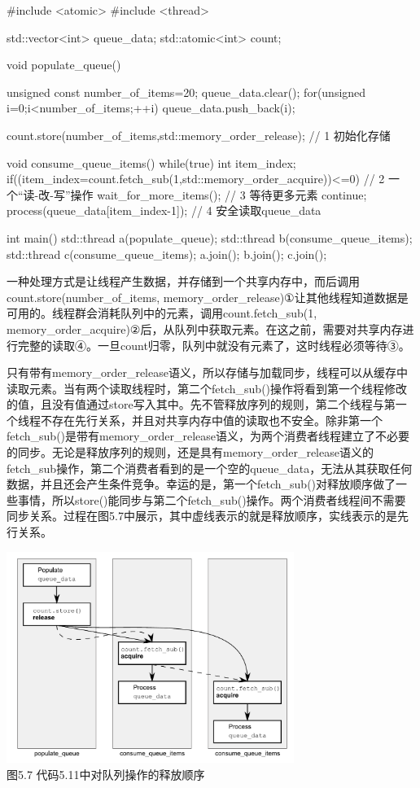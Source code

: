 \begin{cpp}
#include <atomic>
#include <thread>

std::vector<int> queue_data;
std::atomic<int> count;

void populate_queue()
{
  unsigned const number_of_items=20;
  queue_data.clear();
  for(unsigned i=0;i<number_of_items;++i)
  {
    queue_data.push_back(i);
  }

  count.store(number_of_items,std::memory_order_release);  // 1 初始化存储
}

void consume_queue_items()
{
  while(true)
  {
    int item_index;
    if((item_index=count.fetch_sub(1,std::memory_order_acquire))<=0)  // 2 一个“读-改-写”操作
    {
      wait_for_more_items();  // 3 等待更多元素
      continue;
    }
    process(queue_data[item_index-1]);  // 4 安全读取queue_data
  }
}

int main()
{
  std::thread a(populate_queue);
  std::thread b(consume_queue_items);
  std::thread c(consume_queue_items);
  a.join();
  b.join();
  c.join();
}
\end{cpp}

一种处理方式是让线程产生数据，并存储到一个共享内存中，而后调用count.store(number\_of\_items, memory\_order\_release)①让其他线程知道数据是可用的。线程群会消耗队列中的元素，调用count.fetch\_sub(1, memory\_order\_acquire)②后，从队列中获取元素。在这之前，需要对共享内存进行完整的读取④。一旦count归零，队列中就没有元素了，这时线程必须等待③。

只有带有memory\_order\_release语义，所以存储与加载同步，线程可以从缓存中读取元素。当有两个读取线程时，第二个fetch\_sub()操作将看到第一个线程修改的值，且没有值通过store写入其中。先不管释放序列的规则，第二个线程与第一个线程不存在先行关系，并且对共享内存中值的读取也不安全。除非第一个fetch\_sub()是带有memory\_order\_release语义，为两个消费者线程建立了不必要的同步。无论是释放序列的规则，还是具有memory\_order\_release语义的fetch\_sub操作，第二个消费者看到的是一个空的queue\_data，无法从其获取任何数据，并且还会产生条件竞争。幸运的是，第一个fetch\_sub()对释放顺序做了一些事情，所以store()能同步与第二个fetch\_sub()操作。两个消费者线程间不需要同步关系。过程在图5.7中展示，其中虚线表示的就是释放顺序，实线表示的是先行关系。


\begin{center}
    \includegraphics[width=0.7\textwidth]{content/chapter05/images/5-7.png}\\
    图5.7 代码5.11中对队列操作的释放顺序
\end{center}

